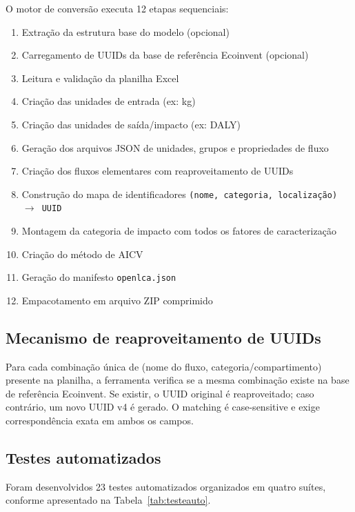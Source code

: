 O motor de convers\~ao executa 12 etapas sequenciais:

\begin{enumerate}[label=\arabic*.]
    \item Extra\c{c}\~ao da estrutura base do modelo (opcional)
    \item Carregamento de UUIDs da base de refer\^encia Ecoinvent (opcional)
    \item Leitura e valida\c{c}\~ao da planilha Excel
    \item Cria\c{c}\~ao das unidades de entrada (ex: kg)
    \item Cria\c{c}\~ao das unidades de sa\'ida/impacto (ex: DALY)
    \item Gera\c{c}\~ao dos arquivos JSON de unidades, grupos e propriedades de fluxo
    \item Cria\c{c}\~ao dos fluxos elementares com reaproveitamento de UUIDs
    \item Constru\c{c}\~ao do mapa de identificadores \texttt{(nome, categoria, localiza\c{c}\~ao) $\rightarrow$ UUID}
    \item Montagem da categoria de impacto com todos os fatores de caracteriza\c{c}\~ao
    \item Cria\c{c}\~ao do m\'etodo de AICV
    \item Gera\c{c}\~ao do manifesto \texttt{openlca.json}
    \item Empacotamento em arquivo ZIP comprimido
\end{enumerate}

\subsection{Mecanismo de reaproveitamento de UUIDs}

Para cada combina\c{c}\~ao \'unica de (nome do fluxo, categoria/compartimento) presente na planilha, a ferramenta verifica se a mesma combina\c{c}\~ao existe na base de refer\^encia Ecoinvent. Se existir, o UUID original \'e reaproveitado; caso contr\'ario, um novo UUID v4 \'e gerado. O matching \'e case-sensitive e exige correspond\^encia exata em ambos os campos.

\subsection{Testes automatizados}

Foram desenvolvidos 23 testes automatizados organizados em quatro su\'ites, conforme apresentado na Tabela~\ref{tab:testeauto}.



